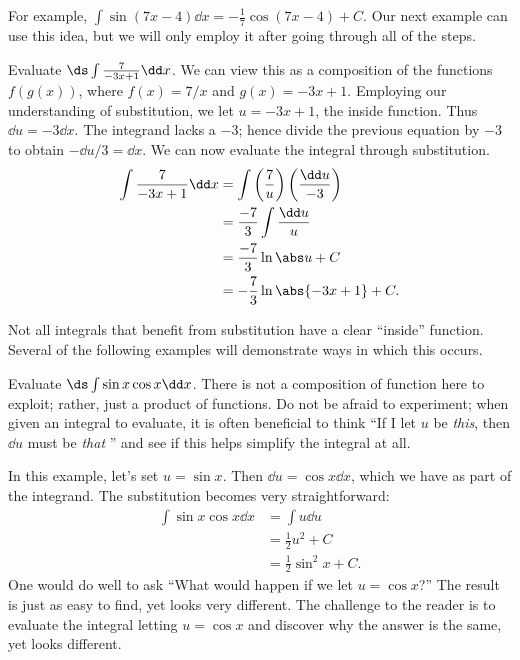 For example, $\int \sin (7x-4)\dd x = -\frac17\cos(7x-4)+C$. Our next example can use this idea, but we will only employ it after going through all of the steps.

\begin{example}\label{ex_sub3}
Evaluate $\ds \int \frac{7}{-3x+1}\dd x$.
\solution
We can view this as a composition of the functions $f(g(x))$, where $f(x) = 7/x$ and $g(x) = -3x+1$. Employing our understanding of substitution, we let $u = -3x+1$, the inside function. Thus $\dd u = -3\dd x$. The integrand lacks a $-3$; hence divide the previous equation by $-3$ to obtain $-\dd u/3 = \dd x$. We can now evaluate the integral through substitution.
\begin{align*}
	\int \frac{7}{-3x+1}\dd x
	&= \int\left(\frac{7}{u}\right)\left(\frac{\dd u}{-3}\right) \\
	&= \frac{-7}3\int \frac{\dd u}{u} \\
	&= \frac{-7}3\ln \abs u + C\\
	&= -\frac73\ln\abs{-3x+1} + C.
\end{align*}
\end{example}

Not all integrals that benefit from substitution have a clear ``inside'' function. Several of the following examples will demonstrate ways in which this occurs.

\begin{example}\label{ex_sub10}
Evaluate $\ds \int \sin x\cos x\dd x$.
\solution
There is not a composition of function here to exploit; rather, just a product of functions. Do not be afraid to experiment; when given an integral to evaluate, it is often beneficial to think ``If I let $u$ be \emph{this}, then $\dd u$ must be \emph{that} \dotso'' and see if this helps simplify the integral at all.

In this example, let's set $u = \sin x$. Then $\dd u = \cos x\dd x$, which we have as part of the integrand. The substitution becomes very straightforward:
\begin{align*}
	\int \sin x\cos x\dd x
	&=	\int u\dd u \\
	&= \frac12u^2+ C \\
	&= \frac12\sin^2 x + C.
\end{align*}
One would do well to ask ``What would happen if we let $u = \cos x$?'' The result is just as easy to find, yet looks very different. The challenge to the reader is to evaluate the integral letting $u = \cos x$ and discover why the answer is the same, yet looks different.
\end{example}

